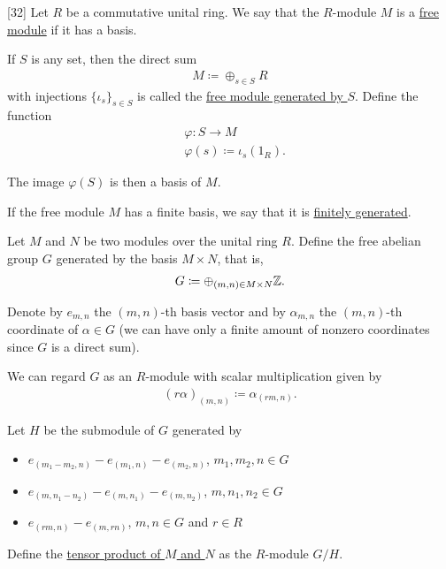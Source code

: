 \begin{definition}\label{def:free_module}[32]\cite{Kocev2016}
  Let $R$ be a commutative unital ring. We say that the $R$-module $M$ is a \uline{free module} if it has a basis.

  If $S$ is any set, then the direct sum
  \begin{align*}
    M \coloneqq \oplus_{s \in S} R
  \end{align*}
  with injections $\{ \iota_s \}_{s \in S}$ is called the \uline{free module generated by $S$}. Define the function
  \begin{align*}
    &\varphi: S \to M \\
    &\varphi(s) \coloneqq \iota_s(1_R).
  \end{align*}

  The image $\varphi(S)$ is then a basis of $M$.

  If the free module $M$ has a finite basis, we say that it is \uline{finitely generated}.
\end{definition}

\begin{definition}\label{def:module_tensor_product}\cite[574]{Knapp2016BAlg}
  Let $M$ and $N$ be two modules over the unital ring $R$. Define the free abelian group\label{def:free_abelian_group} $G$ generated by the basis $M \times N$, that is,
  \begin{align*}
    G \coloneqq \oplus_{(m,n) \in M \times N} \mathbb Z.
  \end{align*}

  Denote by $e_{m,n}$ the $(m,n)$-th basis vector and by $\alpha_{m,n}$ the $(m,n)$-th coordinate of $\alpha \in G$ (we can have only a finite amount of nonzero coordinates since $G$ is a direct sum).

  We can regard $G$ as an $R$-module with scalar multiplication given by
  \begin{align*}
    (r \alpha)_{(m,n)} \coloneqq \alpha_{(rm,n)}.
  \end{align*}

  Let $H$ be the submodule of $G$ generated by
  \begin{itemize}
    \item $e_{(m_1 - m_2, n)} - e_{(m_1,n)} - e_{(m_2,n)}$, $m_1, m_2, n \in G$
    \item $e_{(m, n_1 - n_2)} - e_{(m,n_1)} - e_{(m,n_2)}$, $m, n_1, n_2 \in G$
    \item $e_{(rm,n)} - e_{(m,rn)}$, $m, n \in G$ and $r \in R$
  \end{itemize}

  Define the \uline{tensor product of $M$ and $N$} as the $R$-module $G / H$.
\end{definition}

